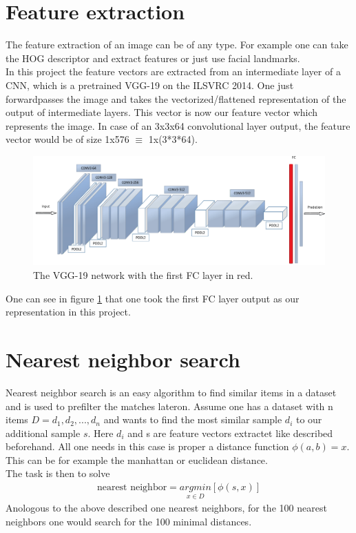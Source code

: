 \documentclass[
     11pt,         %
     a4paper,      %
     oneside,
     ]{article}
\begin{document}
\section{Feature extraction}
The feature extraction of an image can be of any type. For example one can take the HOG descriptor and extract features or just use facial landmarks.\\
In this project the feature vectors are extracted from an intermediate layer of a CNN, which is a pretrained VGG-19 on the ILSVRC 2014.
One just forwardpasses the image and takes the vectorized/flattened representation of the output of intermediate layers.
This vector is now our feature vector which represents the image. In case of an 3x3x64 convolutional layer output, the feature vector would be of size 1x576 $\equiv$ 1x(3*3*64).\\
\begin{figure}[H]
  \begin{center}
    \includegraphics[width=1.0\textwidth]{images/VGG19.png}
    \caption{The VGG-19 network with the first FC layer in red.}
    \label{fig:VGG19}
  \end{center}
\end{figure}
One can see in figure \ref{fig:VGG19} that one took the first FC layer output as our representation in this project.


\section{Nearest neighbor search}
Nearest neighbor search is an easy algorithm to find similar items in a dataset and is used to prefilter the matches lateron. Assume one has a dataset with n items $D = {d_1, d_2, ..., d_n}$ and wants to find the most similar sample $d_i$ to our additional sample $s$. Here $d_i$ and s are feature vectors extractet like described beforehand. All one needs in this case is proper a distance function $\phi(a,b) = x$. This can be for example the manhattan or euclidean distance. \\
The task is then to solve
\begin{align*}
  \text{nearest neighbor} = \underset{x \in D}{argmin} [\phi(s,x)]
\end{align*}
Anologous to the above described one nearest neighbors, for the 100 nearest neighbors one would search for the 100 minimal distances.
\end{document}
